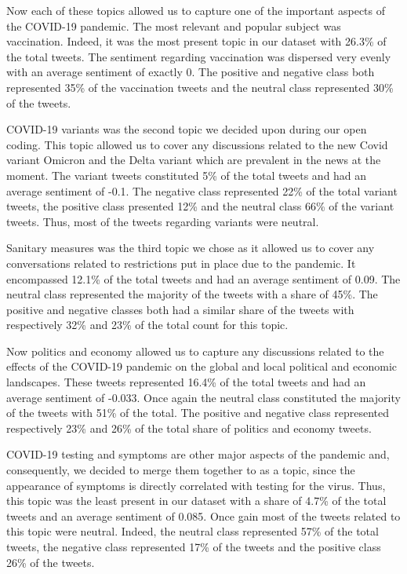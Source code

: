 \documentclass[letterpaper]{article} %
\begin{document}
Now each of these topics allowed us to capture one of the important aspects of the COVID-19 pandemic. The most relevant and popular subject was vaccination. Indeed, it was the most present topic in our dataset with 26.3\% of the total tweets. The sentiment regarding vaccination was dispersed very evenly with an average sentiment of exactly 0. The positive and negative class both represented 35\% of the vaccination tweets and the neutral class represented 30\% of the tweets.

COVID-19 variants was the second topic we decided upon during our open coding. This topic allowed us to cover any discussions related to the new Covid variant Omicron and the Delta variant which are prevalent in the news at the moment. The variant tweets constituted 5\% of the total tweets and had an average sentiment of -0.1. The negative class represented 22\% of the total variant tweets, the positive class presented 12\% and the neutral class 66\% of the variant tweets. Thus, most of the tweets regarding variants were neutral.

Sanitary measures was the third topic we chose as it allowed us to cover any conversations related to restrictions put in place due to the pandemic. It encompassed 12.1\% of the total tweets and had an average sentiment of 0.09. The neutral class represented the majority of the tweets with a share of 45\%. The positive and negative classes both had a similar share of the tweets with respectively 32\% and 23\% of the total count for this topic.

Now politics and economy allowed us to capture any discussions related to the effects of the COVID-19 pandemic on the global and local political and economic landscapes. These tweets represented 16.4\% of the total tweets and had an average sentiment of -0.033. Once again the neutral class constituted the majority of the tweets with 51\% of the total. The positive and negative class represented respectively 23\% and 26\% of the total share of politics and economy tweets.

COVID-19 testing and symptoms are other major aspects of the pandemic and, consequently, we decided to merge them together to as a topic, since the appearance of symptoms is directly correlated with testing for the virus. Thus, this topic was the least present in our dataset with a share of 4.7\% of the total tweets and an average sentiment of 0.085. Once gain most of the tweets related to this topic were neutral. Indeed, the neutral class represented 57\% of the total tweets, the negative class represented 17\% of the tweets and the positive class 26\% of the tweets. 
\end{document}
